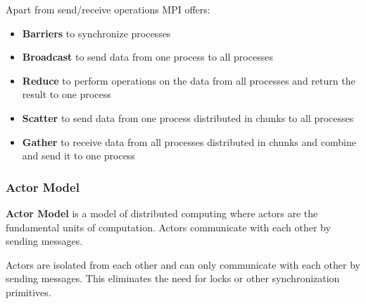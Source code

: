 \begin{definition}
    Apart from send/receive operations MPI offers:
    \begin{itemize}
        \item \textbf{Barriers} to synchronize processes
        \item \textbf{Broadcast} to send data from one process to all processes
        \item \textbf{Reduce} to perform operations on the data from all processes and return the result to one process
        \item \textbf{Scatter} to send data from one process distributed in chunks to all processes
        \item \textbf{Gather} to receive data from all processes distributed in chunks and combine and send it to one process
    \end{itemize}
\end{definition}

\subsubsection{Actor Model}

\begin{definition}
    \textbf{Actor Model} is a model of distributed computing where actors are the fundamental units of computation. Actors communicate with each other by sending messages.
\end{definition}

\begin{remark}
    Actors are isolated from each other and can only communicate with each other by sending messages. This eliminates the need for locks or other synchronization primitives.
\end{remark}